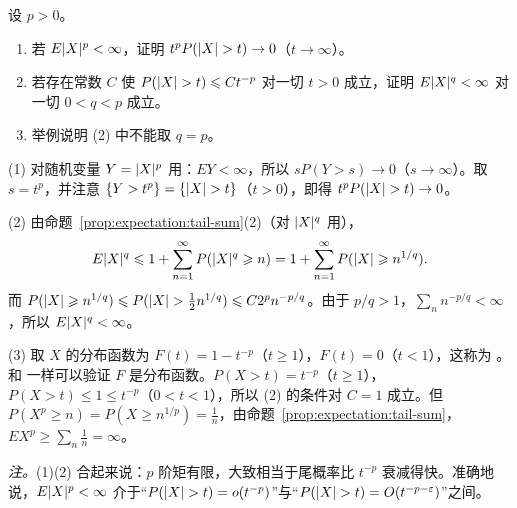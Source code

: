\begin{workedexample}\label{we:expectation:moments-tails}
设 $p>0$。
\begin{enumerate}
\item 若 $E\lvert X\rvert^p<\infty$，证明 $t^pP(\lvert X\rvert>t)\to0$（$t\to\infty$）。
\item 若存在常数 $C$ 使 $P(\lvert X\rvert>t)\leqslant Ct^{-p}$ 对一切 $t>0$ 成立，证明 $E\lvert X\rvert^q<\infty$ 对一切 $0<q<p$ 成立。
\item 举例说明 (2) 中不能取 $q=p$。
\end{enumerate}
\end{workedexample}
\begin{solution}
(1) 对随机变量 $Y=\lvert X\rvert^p$ 用：$EY<\infty$，所以 $sP(Y>s)\to0$（$s\to\infty$）。取 $s=t^p$，并注意 $\{Y>t^p\}=\{\lvert X\rvert>t\}$（$t>0$），即得 $t^pP(\lvert X\rvert>t)\to0$。

(2) 由命题~\ref{prop:expectation:tail-sum}(2)（对 $\lvert X\rvert^q$ 用），
\[
E\lvert X\rvert^q\leqslant1+\sum_{n=1}^\infty P(\lvert X\rvert^q\geqslant n)=1+\sum_{n=1}^\infty P(\lvert X\rvert\geqslant n^{1/q}).
\]
而 $P(\lvert X\rvert\geqslant n^{1/q})\leqslant P(\lvert X\rvert>\frac12n^{1/q})\leqslant C2^pn^{-p/q}$。由于 $p/q>1$，$\sum_nn^{-p/q}<\infty$，所以 $E\lvert X\rvert^q<\infty$。

(3) 取 $X$ 的分布函数为 $F(t)=1-t^{-p}$（$t\geqslant1$），$F(t)=0$（$t<1$），这称为 。和 一样可以验证 $F$ 是分布函数。$P(X>t)=t^{-p}$（$t\geqslant1$），$P(X>t)\leqslant1\leqslant t^{-p}$（$0<t<1$），所以 (2) 的条件对 $C=1$ 成立。但 $P(X^p\geqslant n)=P(X\geqslant n^{1/p})=\frac1n$，由命题~\ref{prop:expectation:tail-sum}，$EX^p\geqslant\sum_n\frac1n=\infty$。

\emph{注。}(1)(2) 合起来说：$p$ 阶矩有限，大致相当于尾概率比 $t^{-p}$ 衰减得快。准确地说，$E\lvert X\rvert^p<\infty$ 介于“$P(\lvert X\rvert>t)=o(t^{-p})$”与“$P(\lvert X\rvert>t)=O(t^{-p-\varepsilon})$”之间。
\end{solution}

